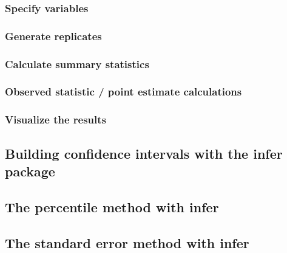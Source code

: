 \documentclass[
  12pt, krantz2,
]{krantz}
\begin{document}
\hypertarget{specify-variables}{%
\subsubsection*{Specify variables}\label{specify-variables}}


\hypertarget{generate-replicates}{%
\subsubsection*{Generate replicates}\label{generate-replicates}}


\hypertarget{calculate-summary-statistics}{%
\subsubsection*{Calculate summary statistics}\label{calculate-summary-statistics}}


\hypertarget{observed-statistic-point-estimate-calculations}{%
\subsubsection*{Observed statistic / point estimate calculations}\label{observed-statistic-point-estimate-calculations}}


\hypertarget{visualize-the-results}{%
\subsubsection*{Visualize the results}\label{visualize-the-results}}


\hypertarget{infer-ci}{%
\subsection{Building confidence intervals with the infer package}\label{infer-ci}}

\hypertarget{percentile-method-infer}{%
\subsection{The percentile method with infer}\label{percentile-method-infer}}

\hypertarget{the-standard-error-method-with-infer}{%
\subsection{The standard error method with infer}\label{the-standard-error-method-with-infer}}
\end{document}
